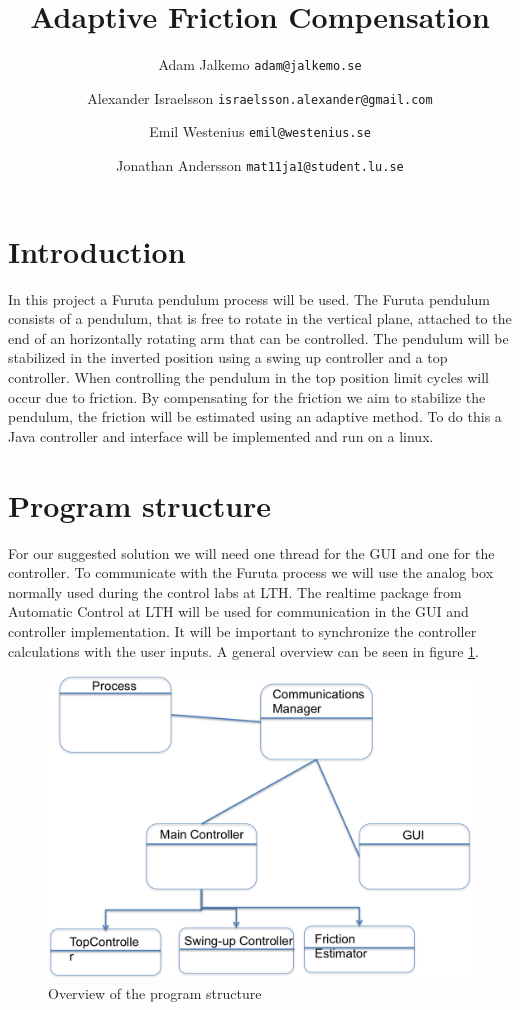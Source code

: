 \documentclass[10pt,a4paper]{article}
\author{Adam Jalkemo \texttt{adam@jalkemo.se} \and
Alexander Israelsson \texttt{israelsson.alexander@gmail.com} \and
Emil Westenius \texttt{emil@westenius.se} \and
Jonathan Andersson \texttt{mat11ja1@student.lu.se}}
\title{Adaptive Friction Compensation}
\begin{document}
\maketitle

\section{Introduction}
In this project a Furuta pendulum process will be used. The Furuta pendulum consists of a pendulum, that is free to rotate in the vertical plane, attached to the end of an horizontally rotating arm that can be controlled. The pendulum will be stabilized in the inverted position using a swing up controller and a top controller. When controlling the pendulum in the top position limit cycles will occur due to friction. By compensating for the friction we aim to stabilize the pendulum, the friction will be estimated using an adaptive method. To do this a Java controller and interface will be implemented and run on a linux.
\section{Program structure}
For our suggested solution we will need one thread for the GUI and one for the controller. To communicate with the Furuta process we will use the analog box normally used during the control labs at LTH. The realtime package from Automatic Control at LTH will be used for communication in the GUI and controller implementation. It will be important to synchronize the controller calculations with the user inputs. A general overview can be seen in figure \ref{fig:uml}.
\begin{figure}[H]
\centerline{\includegraphics[scale=0.7]{umlfuruta.png}}
\caption{Overview of the program structure}
\label{fig:uml}
\end{figure}
\end{document}
